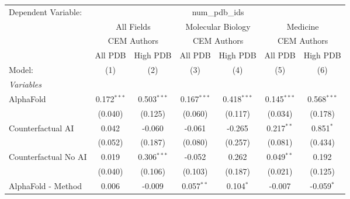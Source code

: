 \begingroup
\centering
\begin{tabular}{lcccccc}
   \tabularnewline \midrule \midrule
   Dependent Variable: & \multicolumn{6}{c}{num\_pdb\_ids}\\
 & \multicolumn{2}{c}{All Fields} & \multicolumn{2}{c}{Molecular Biology} & \multicolumn{2}{c}{Medicine} \\
\cmidrule(lr){2-3} \cmidrule(lr){4-5} \cmidrule(lr){6-7}
 & \multicolumn{2}{c}{CEM Authors} & \multicolumn{2}{c}{CEM Authors} & \multicolumn{2}{c}{CEM Authors} \\
\cmidrule(lr){2-3} \cmidrule(lr){4-5} \cmidrule(lr){6-7}
 & \multicolumn{1}{c}{All PDB} & \multicolumn{1}{c}{High PDB} & \multicolumn{1}{c}{All PDB} & \multicolumn{1}{c}{High PDB} & \multicolumn{1}{c}{All PDB} & \multicolumn{1}{c}{High PDB} \\
\cmidrule(lr){2-2} \cmidrule(lr){3-3} \cmidrule(lr){4-4} \cmidrule(lr){5-5} \cmidrule(lr){6-6} \cmidrule(lr){7-7}
   Model:                                                     & (1)           & (2)           & (3)           & (4)           & (5)           & (6)\\  
   \midrule
   \emph{Variables}\\
   AlphaFold                                                  & 0.172$^{***}$ & 0.503$^{***}$ & 0.167$^{***}$ & 0.418$^{***}$ & 0.145$^{***}$ & 0.568$^{***}$\\   
                                                              & (0.040)       & (0.125)       & (0.060)       & (0.117)       & (0.034)       & (0.178)\\   
   Counterfactual AI                                          & 0.042         & -0.060        & -0.061        & -0.265        & 0.217$^{**}$  & 0.851$^{*}$\\   
                                                              & (0.052)       & (0.187)       & (0.080)       & (0.257)       & (0.081)       & (0.434)\\   
   Counterfactual No AI                                       & 0.019         & 0.306$^{***}$ & -0.052        & 0.262         & 0.049$^{**}$  & 0.192\\   
                                                              & (0.040)       & (0.106)       & (0.103)       & (0.187)       & (0.021)       & (0.125)\\   
   AlphaFold - Method                                         & 0.006         & -0.009        & 0.057$^{**}$  & 0.104$^{*}$   & -0.007        & -0.059$^{*}$\\   

\end{tabular}
